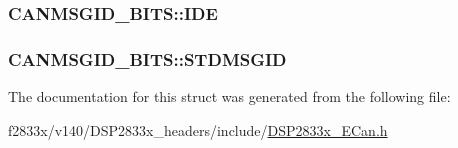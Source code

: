 \subsubsection[{I\+D\+E}]{ C\+A\+N\+M\+S\+G\+I\+D\+\_\+\+B\+I\+T\+S\+::\+I\+D\+E}\label{struct_c_a_n_m_s_g_i_d___b_i_t_s_a777b15075c7a7a33296f2079f3618090}
\hypertarget{struct_c_a_n_m_s_g_i_d___b_i_t_s_a55c2da7e96ac75548f9d04529d776bad}{}
\subsubsection[{S\+T\+D\+M\+S\+G\+I\+D}]{ C\+A\+N\+M\+S\+G\+I\+D\+\_\+\+B\+I\+T\+S\+::\+S\+T\+D\+M\+S\+G\+I\+D}\label{struct_c_a_n_m_s_g_i_d___b_i_t_s_a55c2da7e96ac75548f9d04529d776bad}


The documentation for this struct was generated from the following file\+:\begin{DoxyCompactItemize}
\item 
f2833x/v140/\+D\+S\+P2833x\+\_\+headers/include/\hyperlink{_d_s_p2833x___e_can_8h}{D\+S\+P2833x\+\_\+\+E\+Can.\+h}\end{DoxyCompactItemize}
